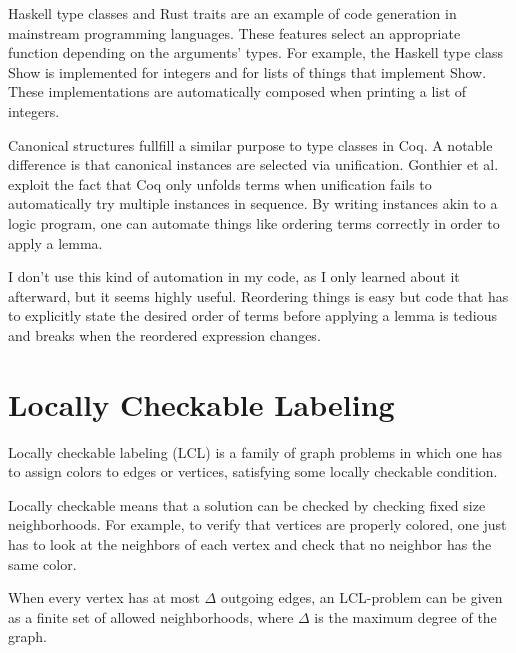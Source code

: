 \documentclass[english, 12pt, a4paper, sci, a-1b, online]{aaltothesis}
\begin{document}
Haskell type classes and Rust traits are an example of code generation in mainstream programming languages. These features select an appropriate function depending on the arguments' types. For example, the Haskell type class Show is implemented for integers and for lists of things that implement Show. These implementations are automatically composed when printing a list of integers.

Canonical structures fullfill a similar purpose to type classes in Coq. A notable difference is that canonical instances are selected via unification. Gonthier et al.~\cite{overloadingCanonical} exploit the fact that Coq only unfolds terms when unification fails to automatically try multiple instances in sequence. By writing instances akin to a logic program, one can automate things like ordering terms correctly in order to apply a lemma.

I don't use this kind of automation in my code, as I only learned about it afterward, but it seems highly useful. Reordering things is easy but code that has to explicitly state the desired order of terms before applying a lemma is tedious and breaks when the reordered expression changes.

\section{Locally Checkable Labeling}

Locally checkable labeling (LCL) is a family of graph problems in which one has to assign colors to edges or vertices, satisfying some locally checkable condition.~\cite{LCL}

Locally checkable means that a solution can be checked by checking fixed size neighborhoods. For example, to verify that vertices are properly colored, one just has to look at the neighbors of each vertex and check that no neighbor has the same color.

When every vertex has at most $\Delta$ outgoing edges, an LCL-problem can be given as a finite set of allowed neighborhoods, where $\Delta$ is the maximum degree of the graph.

\newcommand\tick{\fill[scale=0.6, color=black!40!green](0,.35) -- (.25,0) -- (1,.7) -- (.25,.15) -- cycle;}
\newcommand\cross{\draw[scale=0.3, very thick, color=red] (0,0) -- (1, 1) {} (0, 1) -- (1, 0) {};}
\end{document}
